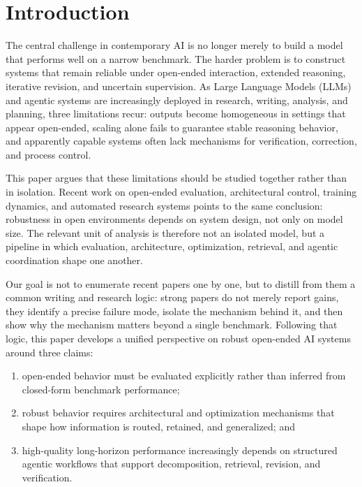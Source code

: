 \section{Introduction}
The central challenge in contemporary AI is no longer merely to build a model that performs well on a narrow benchmark. The harder problem is to construct systems that remain reliable under open-ended interaction, extended reasoning, iterative revision, and uncertain supervision. As Large Language Models (LLMs) and agentic systems are increasingly deployed in research, writing, analysis, and planning, three limitations recur: outputs become homogeneous in settings that appear open-ended, scaling alone fails to guarantee stable reasoning behavior, and apparently capable systems often lack mechanisms for verification, correction, and process control.

This paper argues that these limitations should be studied together rather than in isolation. Recent work on open-ended evaluation, architectural control, training dynamics, and automated research systems points to the same conclusion: robustness in open environments depends on system design, not only on model size. The relevant unit of analysis is therefore not an isolated model, but a pipeline in which evaluation, architecture, optimization, retrieval, and agentic coordination shape one another.

Our goal is not to enumerate recent papers one by one, but to distill from them a common writing and research logic: strong papers do not merely report gains, they identify a precise failure mode, isolate the mechanism behind it, and then show why the mechanism matters beyond a single benchmark. Following that logic, this paper develops a unified perspective on robust open-ended AI systems around three claims:
\begin{enumerate}[leftmargin=1.5em]
\item open-ended behavior must be evaluated explicitly rather than inferred from closed-form benchmark performance;
\item robust behavior requires architectural and optimization mechanisms that shape how information is routed, retained, and generalized; and
\item high-quality long-horizon performance increasingly depends on structured agentic workflows that support decomposition, retrieval, revision, and verification.
\end{enumerate}

